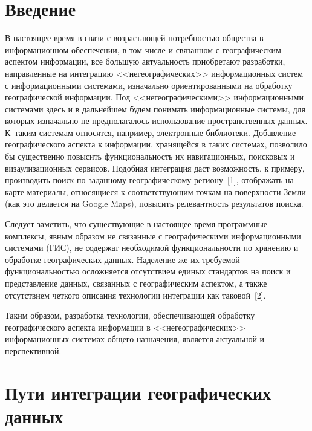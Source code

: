       \begin{multicols}{2}

            \label{st\stat}


  \section{Введение}
  
  В настоящее время в связи с возрастающей потребностью общества в информационном 
обеспечении, в том числе и связанном с географическим аспектом информации, все большую 
актуальность приобретают разработки, направленные на интеграцию <<негеографических>> 
информационных сис\-тем с информационными сис\-те\-ма\-ми, изначально ориентированными на 
обработку географической информации. Под <<негеографическими>> 
информационными системами здесь и в дальнейшем будем понимать информационные 
системы, для которых изначально не предполагалось использование пространственных 
данных. К~таким сис\-те\-мам относятся, например, электронные биб\-лио\-те\-ки. Добавление 
географического аспекта к информации, хранящейся в таких системах, позволило бы 
существенно повысить функциональность их навигационных, поисковых и 
визаулизационных сервисов. Подобная интеграция даст возможность, к примеру, 
производить поиск по заданному географическому региону~[1], отображать на карте 
материалы, относящиеся к соответствующим точкам на поверхности Земли (как это делается 
на {Google Maps}), повысить релевантность результатов поиска.
  
  Следует заметить, что существующие в настоящее время программные комплексы, явным\linebreak 
образом не связанные с географическими информационными сис\-те\-ма\-ми (ГИС), не содержат необходимой функциональности по хранению и 
обработке географических данных. Наделение же их требуемой функциональностью 
осложняется отсутствием единых стандартов на поиск и представление данных, связанных с 
географическим аспектом, а также отсутствием четкого описания технологии интеграции как 
таковой~[2].
  
  Таким образом, разработка технологии, обеспечивающей обработку географического 
аспекта информации в <<негеографических>> информационных системах общего 
назначения, является актуальной и перспективной.

\vspace*{-6pt}
  
  \section{Пути интеграции географических данных}
  

\end{multicols}
